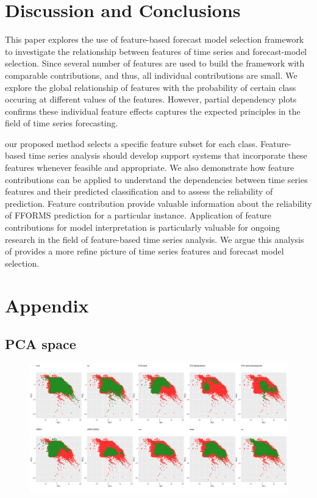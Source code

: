 \documentclass[11pt,a4paper,]{article}
\theoremstyle{definition}
\theoremstyle{definition}
\theoremstyle{definition}
\theoremstyle{remark}
\begin{document}
\section{Discussion and Conclusions}\label{conclusions}

This paper explores the use of feature-based forecast model selection
framework to investigate the relationship between features of time
series and forecast-model selection. Since several number of features
are used to build the framework with comparable contributions, and thus,
all individual contributions are small. We explore the global
relationship of features with the probability of certain class occuring
at different values of the features. However, partial dependency plots
confirms these individual feature effects captures the expected
principles in the field of time series forecasting.

our proposed method selects a specific feature subset for each class.
Feature-based time series analysis should develop support systems that
incorporate these features whenever feasible and appropriate. We also
demonstrate how feature contributions can be applied to understand the
dependencies between time series features and their predicted
classification and to assess the reliability of prediction. Feature
contribution provide valuable information about the reliability of
FFORMS prediction for a particular instance. Application of feature
contributions for model interpretation is particularly valuable for
ongoing research in the field of feature-based time series analysis. We
argue this analysis of provides a more refine picture of time series
features and forecast model selection.

\newpage

\section*{Appendix}\label{appendix}

\subsection*{PCA space}\label{pca-space}

\begin{figure}[h]

{\centering \includegraphics{figures/yearly_pca-1} 

}

\end{figure}
\end{document}
